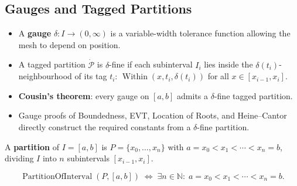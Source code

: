 
\subsection{Gauges and Tagged Partitions}
\label{sec:gauges-tagged-partitions}

\begin{tcolorbox}[title={Toolkit --- Gauges and Tagged Partitions}]
\begin{itemize}
  \item A \textbf{gauge} $\delta:I\to(0,\infty)$ is a variable-width
    tolerance function allowing the mesh to depend on position.
  \item A tagged partition $\dot{\mathcal{P}}$ is $\delta$-fine if
    each subinterval $I_i$ lies inside the $\delta(t_i)$-neighbourhood
    of its tag $t_i$: $\operatorname{Within}(x,t_i,\delta(t_i))$ for
    all $x\in[x_{i-1},x_i]$.
  \item \textbf{Cousin's theorem}: every gauge on $[a,b]$ admits a
    $\delta$-fine tagged partition.
  \item Gauge proofs of Boundedness, EVT, Location of Roots, and
    Heine--Cantor directly construct the required constants from a
    $\delta$-fine partition.
\end{itemize}
\end{tcolorbox}


\begin{definition}[Partition]
\label{def:partition}
A \textbf{partition} of $I=[a,b]$ is $P=\{x_0,\ldots,x_n\}$ with
$a=x_0<x_1<\cdots<x_n=b$, dividing $I$ into $n$ subintervals
$[x_{i-1},x_i]$.
\end{definition}

\begin{remark*}
\[
  \operatorname{PartitionOfInterval}(P,[a,b])
  \;\iff\;
  \exists n\in\mathbb{N}:\;
  a=x_0<x_1<\cdots<x_n=b.
\]
\end{remark*}


